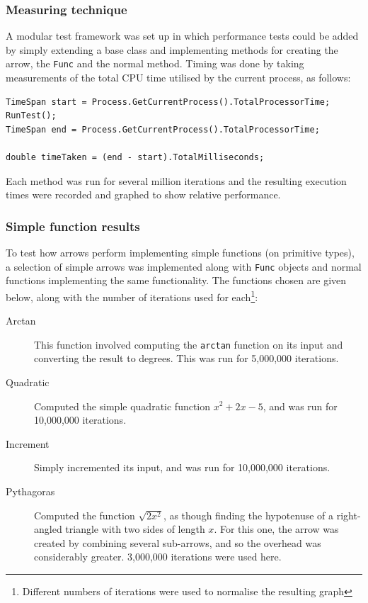 \documentclass[12pt,twoside,notitlepage]{report}
\begin{document}
\subsubsection{Measuring technique}

A modular test framework was set up in which performance tests could be added by simply extending a base class and implementing methods for creating the arrow, the \texttt{Func} and the normal method. Timing was done by taking measurements of the total CPU time utilised by the current process, as follows:

\begin{lstlisting}[language={[sharp]C}]
TimeSpan start = Process.GetCurrentProcess().TotalProcessorTime;
RunTest();
TimeSpan end = Process.GetCurrentProcess().TotalProcessorTime;

double timeTaken = (end - start).TotalMilliseconds;
\end{lstlisting}

Each method was run for several million iterations and the resulting execution times were recorded and graphed to show relative performance.

\subsubsection{Simple function results}

To test how arrows perform implementing simple functions (on primitive types), a selection of simple arrows was implemented along with \texttt{Func} objects and normal functions implementing the same functionality. The functions chosen are given below, along with the number of iterations used for each\footnote{Different numbers of iterations were used to normalise the resulting graph}:

\begin{description}
	\item[Arctan] This function involved computing the \texttt{arctan} function on its input and converting the result to degrees. This was run for 5,000,000 iterations.
	\item[Quadratic] Computed the simple quadratic function $x^2 + 2x - 5$, and was run for 10,000,000 iterations.
	\item[Increment] Simply incremented its input, and was run for 10,000,000 iterations.
	\item[Pythagoras] Computed the function $\sqrt{2 x^2}$, as though finding the hypotenuse of a right-angled triangle with two sides of length $x$. For this one, the arrow was created by combining several sub-arrows, and so the overhead was considerably greater. 3,000,000 iterations were used here.
\end{description}
\end{document}

